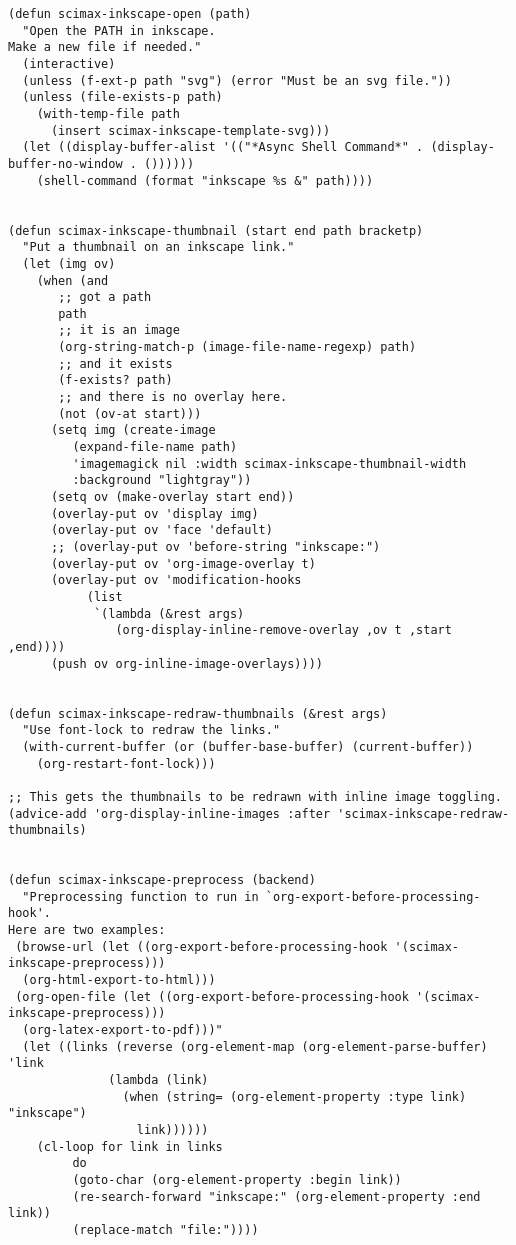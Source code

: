 \documentclass[8pt]{article}
\begin{document}
\begin{verbatim}
(defun scimax-inkscape-open (path)
  "Open the PATH in inkscape.
Make a new file if needed."
  (interactive)
  (unless (f-ext-p path "svg") (error "Must be an svg file."))
  (unless (file-exists-p path)
    (with-temp-file path
      (insert scimax-inkscape-template-svg)))
  (let ((display-buffer-alist '(("*Async Shell Command*" . (display-buffer-no-window . ())))))
    (shell-command (format "inkscape %s &" path))))


(defun scimax-inkscape-thumbnail (start end path bracketp)
  "Put a thumbnail on an inkscape link."
  (let (img ov)
    (when (and
	   ;; got a path
	   path
	   ;; it is an image
	   (org-string-match-p (image-file-name-regexp) path)
	   ;; and it exists
	   (f-exists? path)
	   ;; and there is no overlay here.
	   (not (ov-at start)))
      (setq img (create-image
		 (expand-file-name path)
		 'imagemagick nil :width scimax-inkscape-thumbnail-width
		 :background "lightgray"))
      (setq ov (make-overlay start end))
      (overlay-put ov 'display img)
      (overlay-put ov 'face 'default)
      ;; (overlay-put ov 'before-string "inkscape:")
      (overlay-put ov 'org-image-overlay t)
      (overlay-put ov 'modification-hooks
		   (list
		    `(lambda (&rest args)
		       (org-display-inline-remove-overlay ,ov t ,start ,end))))
      (push ov org-inline-image-overlays))))


(defun scimax-inkscape-redraw-thumbnails (&rest args)
  "Use font-lock to redraw the links."
  (with-current-buffer (or (buffer-base-buffer) (current-buffer))
    (org-restart-font-lock)))

;; This gets the thumbnails to be redrawn with inline image toggling.
(advice-add 'org-display-inline-images :after 'scimax-inkscape-redraw-thumbnails)


(defun scimax-inkscape-preprocess (backend)
  "Preprocessing function to run in `org-export-before-processing-hook'.
Here are two examples:
 (browse-url (let ((org-export-before-processing-hook '(scimax-inkscape-preprocess)))
  (org-html-export-to-html)))
 (org-open-file (let ((org-export-before-processing-hook '(scimax-inkscape-preprocess)))
  (org-latex-export-to-pdf)))"
  (let ((links (reverse (org-element-map (org-element-parse-buffer) 'link
			  (lambda (link)
			    (when (string= (org-element-property :type link) "inkscape")
			      link))))))
    (cl-loop for link in links
	     do
	     (goto-char (org-element-property :begin link))
	     (re-search-forward "inkscape:" (org-element-property :end link))
	     (replace-match "file:"))))



\end{verbatim}
\end{document}
